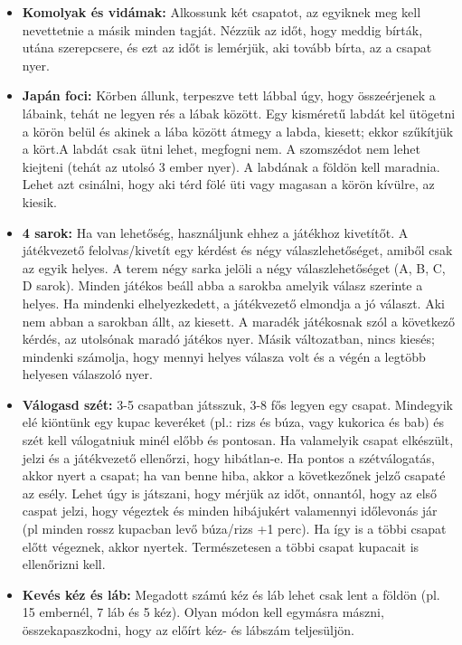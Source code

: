 \documentclass[a4paper, 12pt, twoside, openright]{article}
\begin{document}
\begin{itemize}
\item \textbf{Komolyak és vidámak:} Alkossunk két csapatot, az egyiknek meg kell nevettetnie a másik minden tagját. Nézzük az időt, hogy meddig bírták, utána szerepcsere, és ezt az időt is lemérjük, aki tovább bírta, az a csapat nyer.

\item \textbf{Japán foci:} Körben állunk, terpeszve tett lábbal úgy, hogy összeérjenek a lábaink, tehát ne legyen rés a lábak között. Egy kisméretű labdát kel ütögetni a körön belül és akinek a lába között átmegy a labda, kiesett; ekkor szűkítjük a kört.A labdát csak ütni lehet, megfogni nem. A szomszédot nem lehet kiejteni (tehát az utolsó 3 ember nyer). A labdának a földön kell maradnia. Lehet azt csinálni, hogy aki térd fölé üti vagy magasan a körön kívülre, az kiesik.

\item \textbf{4 sarok:} Ha van lehetőség, használjunk ehhez a játékhoz kivetítőt. A játékvezető felolvas/kivetít egy kérdést és négy válaszlehetőséget, amiből csak az egyik helyes. A terem négy sarka jelöli a négy válaszlehetőséget (A, B, C, D sarok). Minden játékos beáll abba a sarokba amelyik válasz szerinte a helyes. Ha mindenki elhelyezkedett, a játékvezető elmondja a jó választ. Aki nem abban a sarokban állt, az kiesett. A maradék játékosnak szól a következő kérdés, az utolsónak maradó játékos nyer. Másik változatban, nincs kiesés; mindenki számolja, hogy mennyi helyes válasza volt és a végén a legtöbb helyesen válaszoló nyer.

\item \textbf{Válogasd szét:} 3-5 csapatban játsszuk, 3-8 fős legyen egy csapat. Mindegyik elé kiöntünk egy kupac keveréket (pl.: rizs és búza, vagy kukorica és bab) és szét kell válogatniuk minél előbb és pontosan. Ha valamelyik csapat elkészült, jelzi és a játékvezető ellenőrzi, hogy hibátlan-e. Ha pontos a szétválogatás, akkor nyert a csapat; ha van benne hiba, akkor a következőnek jelző csapaté az esély. Lehet úgy is játszani, hogy mérjük az időt, onnantól, hogy az első caspat jelzi, hogy végeztek és minden hibájukért valamennyi időlevonás jár (pl minden rossz kupacban levő búza/rizs +1 perc). Ha így is a többi csapat előtt végeznek, akkor nyertek. Természetesen a többi csapat kupacait is ellenőrizni kell.

\item \textbf{Kevés kéz és láb:} Megadott számú kéz és láb lehet csak lent a földön (pl. 15 embernél, 7 láb és 5 kéz). Olyan módon kell egymásra mászni, összekapaszkodni, hogy az előírt kéz- és lábszám teljesüljön.


\end{itemize}
\end{document}
